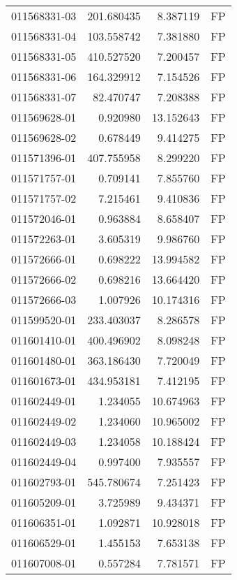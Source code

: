 \begin{tabular}{lrrl}
011568331-03 &  201.680435 &       8.387119 &   FP \\
011568331-04 &  103.558742 &       7.381880 &   FP \\
011568331-05 &  410.527520 &       7.200457 &   FP \\
011568331-06 &  164.329912 &       7.154526 &   FP \\
011568331-07 &   82.470747 &       7.208388 &   FP \\
011569628-01 &    0.920980 &      13.152643 &   FP \\
011569628-02 &    0.678449 &       9.414275 &   FP \\
011571396-01 &  407.755958 &       8.299220 &   FP \\
011571757-01 &    0.709141 &       7.855760 &   FP \\
011571757-02 &    7.215461 &       9.410836 &   FP \\
011572046-01 &    0.963884 &       8.658407 &   FP \\
011572263-01 &    3.605319 &       9.986760 &   FP \\
011572666-01 &    0.698222 &      13.994582 &   FP \\
011572666-02 &    0.698216 &      13.664420 &   FP \\
011572666-03 &    1.007926 &      10.174316 &   FP \\
011599520-01 &  233.403037 &       8.286578 &   FP \\
011601410-01 &  400.496902 &       8.098248 &   FP \\
011601480-01 &  363.186430 &       7.720049 &   FP \\
011601673-01 &  434.953181 &       7.412195 &   FP \\
011602449-01 &    1.234055 &      10.674963 &   FP \\
011602449-02 &    1.234060 &      10.965002 &   FP \\
011602449-03 &    1.234058 &      10.188424 &   FP \\
011602449-04 &    0.997400 &       7.935557 &   FP \\
011602793-01 &  545.780674 &       7.251423 &   FP \\
011605209-01 &    3.725989 &       9.434371 &   FP \\
011606351-01 &    1.092871 &      10.928018 &   FP \\
011606529-01 &    1.455153 &       7.653138 &   FP \\
011607008-01 &    0.557284 &       7.781571 &   FP \\

\end{tabular}
